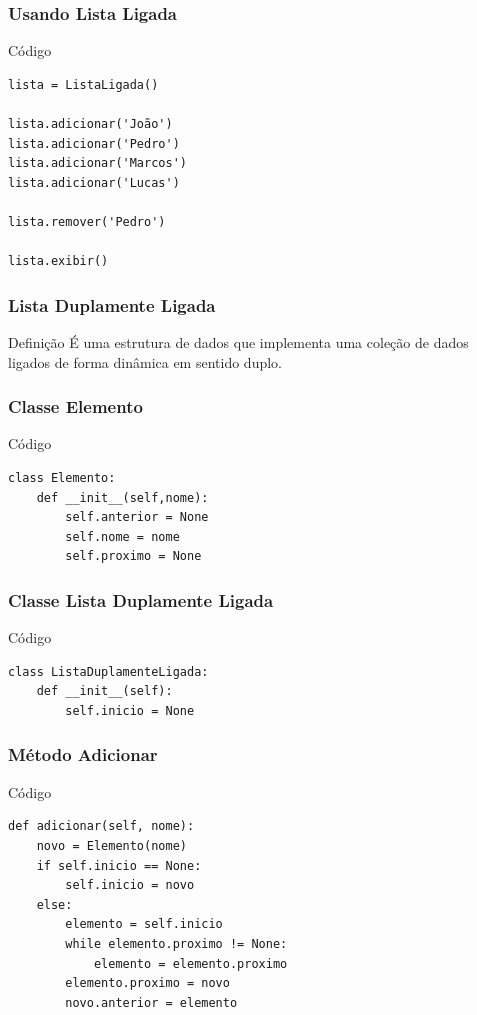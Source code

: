 \documentclass{beamer}
\begin{document}
\begin{frame}[fragile]
\frametitle{Usando Lista Ligada}

\begin{exampleblock}{Código}
	
\begin{lstlisting}
lista = ListaLigada()

lista.adicionar('João')
lista.adicionar('Pedro')
lista.adicionar('Marcos')
lista.adicionar('Lucas')

lista.remover('Pedro')

lista.exibir()
\end{lstlisting}
	
\end{exampleblock}
\end{frame}

\begin{frame}
\frametitle{Lista Duplamente Ligada}

\begin{block}{Definição}
É uma estrutura de dados que implementa uma coleção de dados ligados de forma dinâmica em sentido duplo.
\end{block}
\end{frame}

\begin{frame}[fragile]
\frametitle{Classe Elemento}

\begin{exampleblock}{Código}
\begin{lstlisting}
class Elemento:
    def __init__(self,nome):
        self.anterior = None
        self.nome = nome
        self.proximo = None
\end{lstlisting}
\end{exampleblock}
\end{frame}

\begin{frame}[fragile]
\frametitle{Classe Lista Duplamente Ligada}

\begin{exampleblock}{Código}
\begin{lstlisting}
class ListaDuplamenteLigada:
    def __init__(self):
        self.inicio = None
\end{lstlisting}
\end{exampleblock}
\end{frame}

\begin{frame}[fragile]
\frametitle{Método Adicionar}

\begin{exampleblock}{Código}
\begin{lstlisting}
def adicionar(self, nome):
    novo = Elemento(nome)
    if self.inicio == None:
        self.inicio = novo
    else:
        elemento = self.inicio
        while elemento.proximo != None:
            elemento = elemento.proximo
        elemento.proximo = novo
        novo.anterior = elemento
\end{lstlisting}
\end{exampleblock}
\end{frame}
\end{document}
